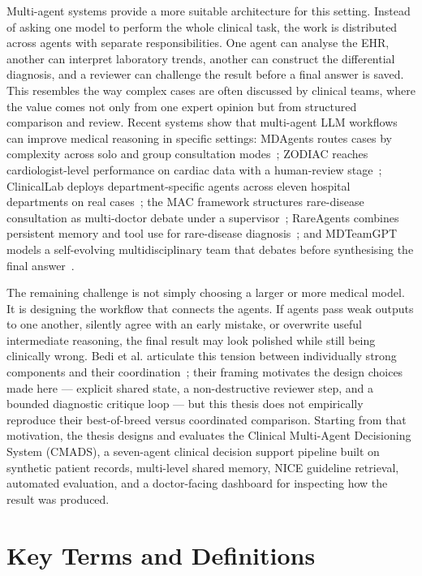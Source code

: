 Multi-agent systems provide a more suitable architecture for this setting.
Instead of asking one model to perform the whole clinical task, the work is
distributed across agents with separate responsibilities. One agent can analyse
the EHR, another can interpret laboratory trends, another can construct the
differential diagnosis, and a reviewer can challenge the result before a final
answer is saved. This resembles the way complex cases are often discussed by
clinical teams, where the value comes not only from one expert opinion but from
structured comparison and review. Recent systems show that multi-agent LLM workflows can improve medical
reasoning in specific settings: MDAgents routes cases by complexity across
solo and group consultation modes~\cite{Kim2024MDAgents}; ZODIAC reaches
cardiologist-level performance on cardiac data with a human-review
stage~\cite{Zhou2024ZODIAC}; ClinicalLab deploys department-specific agents
across eleven hospital departments on real cases~\cite{Yan2024ClinicalLab};
the MAC framework structures rare-disease consultation as multi-doctor
debate under a supervisor~\cite{MAC2025npj}; RareAgents combines persistent
memory and tool use for rare-disease diagnosis~\cite{Chen2024RareAgents};
and MDTeamGPT models a self-evolving multidisciplinary team that debates
before synthesising the final answer~\cite{Chen2025MDTeamGPT}.

The remaining challenge is not simply choosing a larger or more medical model.
It is designing the workflow that connects the agents. If agents pass weak
outputs to one another, silently agree with an early mistake, or overwrite
useful intermediate reasoning, the final result may look polished while still
being clinically wrong. Bedi et al. articulate this tension between
individually strong components and their coordination~\cite{Bedi2025OptParadox};
their framing motivates the design choices made here --- explicit shared
state, a non-destructive reviewer step, and a bounded diagnostic critique
loop --- but this thesis does not empirically reproduce their best-of-breed
versus coordinated comparison. Starting from that motivation, the thesis
designs and evaluates the Clinical Multi-Agent Decisioning System (CMADS),
a seven-agent clinical decision support pipeline built on synthetic patient
records, multi-level shared memory, NICE guideline retrieval, automated
evaluation, and a doctor-facing dashboard for inspecting how the result was
produced.

\section{Key Terms and Definitions}
\label{sec:terms}

